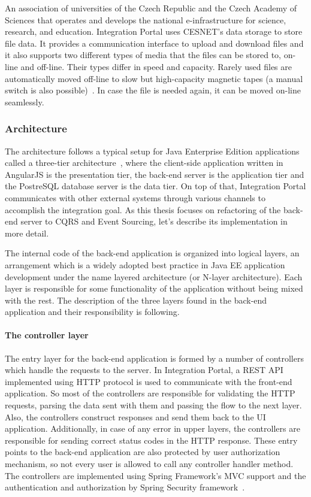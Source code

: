 \documentclass{book}
\begin{document}
An association of universities of the Czech Republic and the Czech
Academy of Sciences that operates and develops the national
e-infrastructure for science, research, and education. Integration
Portal uses CESNET's data storage to store file data. It provides a
communication interface to upload and download files and it also
supports two different types of media that the files can be stored to,
on-line and off-line. Their types differ in speed and capacity. Rarely
used files are automatically moved off-line to slow but high-capacity
magnetic tapes (a manual switch is also possible)~\cite{backend}. In case the file is
needed again, it can be moved on-line seamlessly.

\subsubsection{Architecture}\label{architecture}

The architecture follows a typical setup for Java Enterprise Edition
applications called a three-tier architecture~\cite{p-eap}, where the
client-side application written in AngularJS is the presentation tier,
the back-end server is the application tier and the PostreSQL database
server is the data tier. On top of that, Integration Portal communicates
with other external systems through various channels to accomplish the
integration goal. As this thesis focuses on refactoring of the back-end
server to CQRS and Event Sourcing, let's describe its implementation in
more detail.

The internal code of the back-end application is organized into logical
layers, an arrangement which is a widely adopted best practice in Java
EE application development under the name layered architecture (or
N-layer architecture). Each layer is responsible for some functionality
of the application without being mixed with the rest. The description of
the three layers found in the back-end application and their
responsibility is following.

\paragraph{The controller layer}\label{the-controller-layer}

The entry layer for the back-end application is formed by a number of
controllers which handle the requests to the server. In Integration
Portal, a REST API implemented using HTTP protocol is used to
communicate with the front-end application. So most of the controllers
are responsible for validating the HTTP requests, parsing the data sent
with them and passing the flow to the next layer. Also, the controllers
construct responses and send them back to the UI application.
Additionally, in case of any error in upper layers, the controllers are
responsible for sending correct status codes in the HTTP response. These
entry points to the back-end application are also protected by user
authorization mechanism, so not every user is allowed to call any
controller handler method. The controllers are implemented using Spring
Framework's MVC support and the authentication and authorization by Spring
Security framework~\cite{spring-security}.
\end{document}
